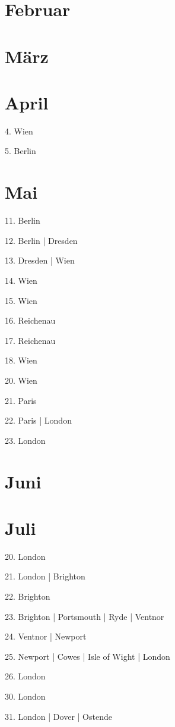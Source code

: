 \documentclass[twoside=false,titlepage=false,open=any, parskip=never, fontsize=10pt, headings=small, chapterprefix=false, appendixprefix=false, DIV=15]{scrbook}
\begin{document}
\begin{multicols}{3}
            \section*{Februar}
            \section*{März}
            \section*{April}
            4. Wien\par
            5. Berlin\par
            \section*{Mai}
            11. Berlin\par
            12. Berlin | Dresden\par
            13. Dresden | Wien\par
            14. Wien\par
            15. Wien\par
            16. Reichenau\par
            17. Reichenau\par
            18. Wien\par
            20. Wien\par
            21. Paris\par
            22. Paris | London\par
            23. London\par
            \section*{Juni}
            \section*{Juli}
            20. London\par
            21. London | Brighton\par
            22. Brighton\par
            23. Brighton | Portsmouth | Ryde | Ventnor\par
            24. Ventnor | Newport\par
            25. Newport | Cowes | Isle of Wight | London\par
            26. London\par
            30. London\par
            31. London | Dover | Ostende\par

\end{multicols}
\end{document}
